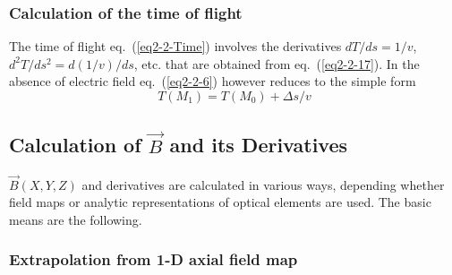 \subsubsection{Calculation of the time of flight \label{CalcTOF}} 

The time of flight  eq.~(\ref{eq2-2-Time}) involves the derivatives 
$dT/ds=1/v$, $d^2T/ds^2=d(1/v)/ds$, etc. that are obtained from eq.~(\ref{eq2-2-17}). In the absence of 
electric field   eq.~(\ref{eq2-2-6}) however reduces to the simple form 
 \begin{equation}
T(M_1) =   T(M_0) +  \Delta s/v  
 \end{equation}


\subsection{Calculation of  $ \vec B $ and its Derivatives}\label{sec2.3}    %

\noindent $ \vec  B(X,Y,Z) $ and 
derivatives are calculated in various ways, depending  whether field maps or analytic
 representations of optical elements are  used. The  basic means are the following. 
 
\subsubsection[Extrapolation from  1-D axial field map]%
      {Extrapolation from  1-D axial field map~\protect\cite{Biblio3}}  
       \label{sec2.3.1} %


